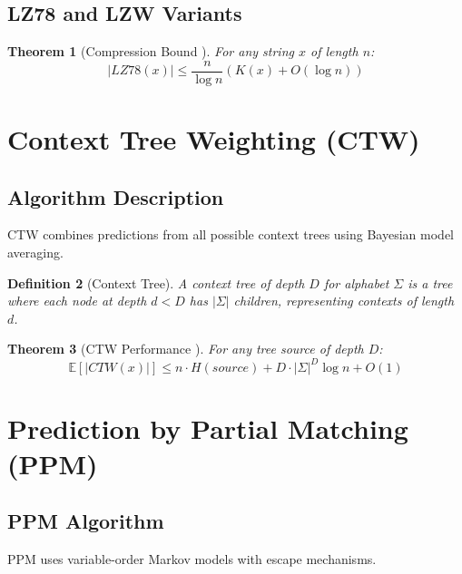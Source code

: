 \documentclass[12pt,a4paper]{report}
\newtheorem{theorem}{Theorem}[chapter]
\newtheorem{definition}[theorem]{Definition}
\begin{document}
\subsection{LZ78 and LZW Variants}

\begin{theorem}[Compression Bound \cite{ziv1978compression}]
For any string $x$ of length $n$:
\begin{equation}
|LZ78(x)| \leq \frac{n}{\log n}(K(x) + O(\log n))
\end{equation}
\end{theorem}

\section{Context Tree Weighting (CTW)}

\subsection{Algorithm Description}

CTW \cite{willems1995context} combines predictions from all possible context trees using Bayesian model averaging.

\begin{definition}[Context Tree]
A context tree of depth $D$ for alphabet $\Sigma$ is a tree where each node at depth $d < D$ has $|\Sigma|$ children, representing contexts of length $d$.
\end{definition}

\begin{theorem}[CTW Performance \cite{willems1995context}]
For any tree source of depth $D$:
\begin{equation}
\mathbb{E}[|CTW(x)|] \leq n \cdot H(source) + D \cdot |\Sigma|^D \log n + O(1)
\end{equation}
\end{theorem}

\section{Prediction by Partial Matching (PPM)}

\subsection{PPM Algorithm}

PPM \cite{cleary1984data} uses variable-order Markov models with escape mechanisms.
\end{document}
